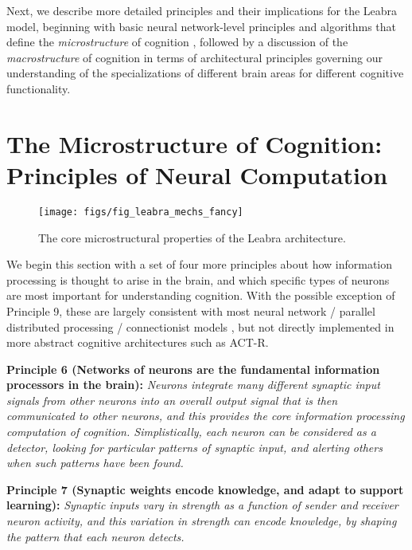 \documentclass[11pt,twoside]{article}
\begin{document}
Next, we describe more detailed principles and their implications for the
Leabra model, beginning with basic neural network-level principles and
algorithms that define the {\em microstructure} of cognition
\cite[c.f.,]{RumelhartMcClelland86,McClellandRumelhart86,McClellandRumelhart88},
followed by a discussion of the {\em macrostructure} of cognition in terms of
architectural principles governing our understanding of the specializations of
different brain areas for different cognitive functionality.

\section{The Microstructure of Cognition: Principles of Neural Computation}

\begin{figure}
  \centering\texttt{[image: figs/fig\_leabra\_mechs\_fancy]}
  \caption{\small The core microstructural properties of the Leabra
    architecture.}
  \label{fig.leabra_mechs}
\end{figure}

We begin this section with a set of four more principles about how information
processing is thought to arise in the brain, and which specific types of
neurons are most important for understanding cognition. With the possible
exception of Principle 9, these are largely consistent with most neural
network / parallel distributed processing / connectionist models
\cite{McClelland93,McClellandRumelhart86,McClellandRumelhart88,RumelhartMcClelland86,OReilly98}, but not directly implemented in more abstract cognitive architectures such as ACT-R.

{\bf Principle 6 (Networks of neurons are the fundamental information
  processors in the brain):} {\em Neurons integrate many different synaptic
  input signals from other neurons into an overall output signal that is then
  communicated to other neurons, and this provides the core information
  processing computation of cognition.  Simplistically, each neuron can be
  considered as a detector, looking for particular patterns of synaptic input,
  and alerting others when such patterns have been found.}

{\bf Principle 7 (Synaptic weights encode knowledge, and adapt to support
  learning):} {\em Synaptic inputs vary in strength as a function of sender
  and receiver neuron activity, and this variation in strength can encode
  knowledge, by shaping the pattern that each neuron detects.}
\end{document}
